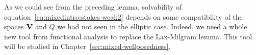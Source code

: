 \begin{remark}
  As we could see from the preceding lemma, solvability of
  equation~\eqref{eq:mixedintro:stokes-weak2} depends on some
  compatibility of the spaces $\mathbf V$ and $Q$ we had not seen in the
  elliptic case. Indeed, we need a whole new tool from functional
  analysis to replace the Lax-Milgram lemma. This tool will be studied
  in Chapter~\ref{sec:mixed-wellposedness}.
\end{remark}


